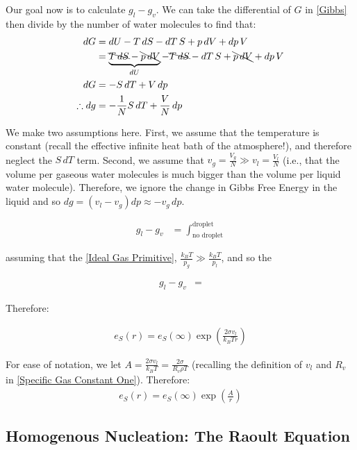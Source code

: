 \noindent Our goal now is to calculate $g_l-g_v$. We can take the differential of $G$ in \ref{Gibbs} then divide by the number of water molecules to find that:
\begin{align*}
    dG &= dU - T\,dS - dT\,S + p\,dV + dp\,V\\
    &= \underbrace{\bcancel{T\,dS} - \bcancel{p\,dV}}_{dU} - \bcancel{T\,dS} - dT\,S + \bcancel{p\,dV} + dp\,V\\
    dG&=-S\,dT + V\,dp\\
    \therefore dg&=-\frac{1}{N}S\,dT + \frac{V}{N}\,dp
\end{align*}

We make two assumptions here. First, we assume that the temperature is constant (recall the effective infinite heat bath of the atmosphere!), and therefore neglect the $S\,dT$ term. Second, we assume that $v_g=\frac{V_g}{N}\gg v_l=\frac{V_l}{N}$ (i.e., that the volume per gaseous water molecules is much bigger than the volume per liquid water molecule). Therefore, we ignore the change in Gibbs Free Energy in the liquid and so $dg=(v_l-v_g)dp\approx -v_g \,dp$.

\begin{align*}
    g_l-g_v&=\int_{\text{no droplet}}^{\text{droplet}}
\end{align*}


assuming that the \ref{Ideal Gas Primitive}, $\frac{k_B T}{p_g}\gg \frac{k_B T}{p_l}$, and so the 

\begin{align*}
    g_l-g_v&=
\end{align*}

Therefore:

\begin{align}
    e_S(r)=e_S(\infty)\exp\left( \frac{2\sigma v_l}{k_B T r} \right)
    \label{Kelvin}
\end{align}

For ease of notation, we let $A=\frac{2\sigma v_l}{k_BT}=\frac{2\sigma}{R_v\rho T}$ (recalling the definition of $v_l$ and $R_v$ in \ref{Specific Gas Constant One}). Therefore:
\begin{align*}
    e_S(r)=e_S(\infty)\exp\left( \frac{A}{r} \right)
\end{align*}

\subsection{Homogenous Nucleation: The Raoult Equation}

